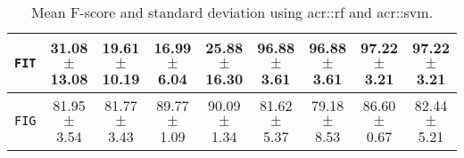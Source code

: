 \begin{table}[htbp]
\begin{tabular}{c | c c | c c | c c | c c}
                    \hline
                    \texttt{FIT} & 31.08 \(\pm\) 13.08 & 19.61 \(\pm\) 10.19 & 16.99 \(\pm\) 6.04 & 25.88 \(\pm\) 16.30 & 96.88 \(\pm\) 3.61 & 96.88 \(\pm\) 3.61 & 97.22 \(\pm\) 3.21 & 97.22 \(\pm\) 3.21 \\
                    \hline
                    \texttt{FIG} & 81.95 \(\pm\) 3.54 & 81.77 \(\pm\) 3.43 & 89.77 \(\pm\) 1.09 & 90.09 \(\pm\) 1.34 & 81.62 \(\pm\) 5.37 & 79.18 \(\pm\) 8.53 & 86.60 \(\pm\) 0.67 & 82.44 \(\pm\) 5.21 \\
                    \hline
                \end{tabular}
                \caption{\label{tab::f_score_rf_vs_svm_f3} Mean F-score and standard deviation using \gls{acr::rf} and \gls{acr::svm}.}
            \end{table}

